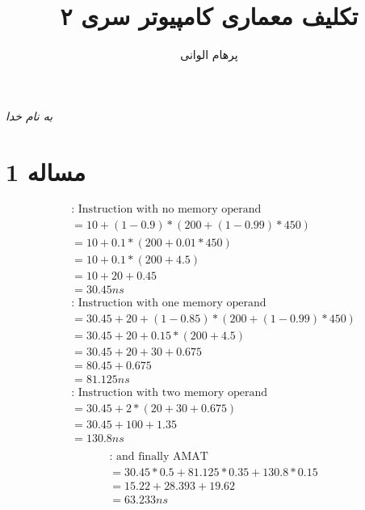 \documentclass[11pt]{article}
\author{پرهام الوانی}
\title{تکلیف معماری کامپیوتر سری ۲}
\begin{document}
\begin{titlepage}
\begin{center}
\emph{به نام خدا}
\end{center}
\maketitle
\begin{center}
\end{center}
\end{titlepage}
\tableofcontents
\newpage
\section{مساله 1}
\begin{align*}
	&\text{: Instruction with no memory operand} \\
	&= 10 + (1 - 0.9) * (200 + (1 - 0.99) * 450) \\
	&= 10 + 0.1 * (200 + 0.01 * 450) \\
	&= 10 + 0.1 * (200 + 4.5) \\
	&= 10 + 20 + 0.45 \\
	&= 30.45ns \\
	&\text{: Instruction with one memory operand} \\
	&= 30.45 + 20 + (1 - 0.85) * (200 + (1 - 0.99) * 450) \\
	&= 30.45 + 20 + 0.15 * (200 + 4.5) \\
	&= 30.45 + 20 + 30 + 0.675 \\
	&= 80.45 + 0.675 \\
	&= 81.125ns \\
	&\text{: Instruction with two memory operand} \\
	&= 30.45 + 2 * (20 + 30 + 0.675) \\
	&= 30.45 + 100 + 1.35 \\
	&= 130.8ns \\
\end{align*}
\begin{align*}
	&\text{: and finally AMAT} \\
	&= 30.45 * 0.5 + 81.125 * 0.35 + 130.8 * 0.15 \\
	&= 15.22 + 28.393 + 19.62 \\
	&= 63.233ns \\
\end{align*}
\end{document}
